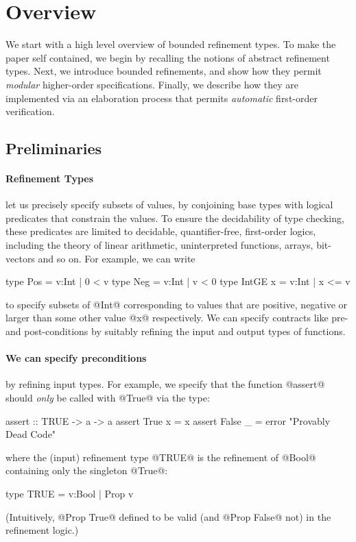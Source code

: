 \section{Overview}\label{sec:overview}

We start with a high level overview of bounded refinement types.
To make the paper self contained, we begin by recalling the notions
of abstract refinement types. Next, we introduce bounded refinements,
and show how they permit \emph{modular} higher-order specifications.
Finally, we describe how they are implemented via an elaboration
process that permits \emph{automatic} first-order verification.

\subsection{Preliminaries} 

\paragraph{Refinement Types} let us precisely specify subsets 
of values, by conjoining base types with logical predicates 
that constrain the values.  To ensure the decidability of 
type checking, these predicates are limited to decidable, 
quantifier-free, first-order logics, including the theory 
of linear arithmetic, uninterpreted functions, arrays, 
bit-vectors and so on. For example, we can write
%
\begin{code}
    type Pos     = {v:Int | 0 < v}
    type Neg     = {v:Int | v < 0}
    type IntGE x = {v:Int | x <= v} 
\end{code}
%
to specify subsets of @Int@ corresponding to values that are 
positive, negative or larger than some other value @x@ respectively.
We can specify contracts like pre- and post-conditions by 
suitably refining the input and output types of functions. 

\paragraph{We can specify preconditions} by refining input types.
For example, we specify that the function @assert@ should 
\emph{only} be called with @True@ via the type:
%
\begin{code}
    assert         :: TRUE -> a -> a
    assert True x  = x
    assert False _ = error "Provably Dead Code"
\end{code}
%
where the (input) refinement type @TRUE@ is the refinement 
of @Bool@ containing only the singleton @True@:
%
\begin{code}
    type TRUE = {v:Bool | Prop v}
\end{code}
%
(Intuitively, @Prop True@ defined to be valid (and @Prop False@ not) 
in the refinement logic.)

